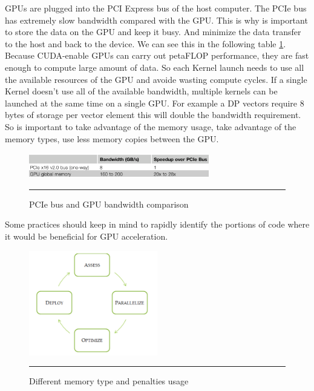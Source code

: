 GPUs are plugged into the PCI Express bus of the host computer. The PCIe bus has extremely slow bandwidth compared with the GPU. This is why is important to store the data on the GPU and keep it busy. And minimize the data transfer to the host and back to the device. We can see this in the following table \ref{fig:PCI}.  Because CUDA-enable GPUs can carry out petaFLOP performance, they are fast enough to compute large amount of data. So each Kernel launch needs to use all the available resources of the GPU and avoide wasting compute cycles. If a single Kernel doesn't use all of the available bandwidth, multiple kernels can be launched at the same time on a single GPU. 
For example a DP vectors require 8 bytes of storage per vector element this will double the bandwidth requirement. So is important to take advantage of the memory usage, take advantage of the memory types, use less memory copies between the GPU. \cite{design}

\begin{figure}[htbp]
	\centering
		\includegraphics[width=0.7\textwidth]{Figures/PCI.png}
		\rule{35em}{0.5pt}
	\caption[PCIe Bandwidth]{PCIe bus and GPU bandwidth comparison }
	\label{fig:PCI}
\end{figure}


Some practices should keep in mind to rapidly identify the portions of code where it would be beneficial for GPU acceleration.  \cite{practices}

\begin{figure}[htbp]
	\centering
		\includegraphics[width=0.5\textwidth]{Figures/apod.png}
		\rule{35em}{0.5pt}
	\caption[Different memory types]{Different memory type and penalties usage}
	\label{fig:apod}
\end{figure}

